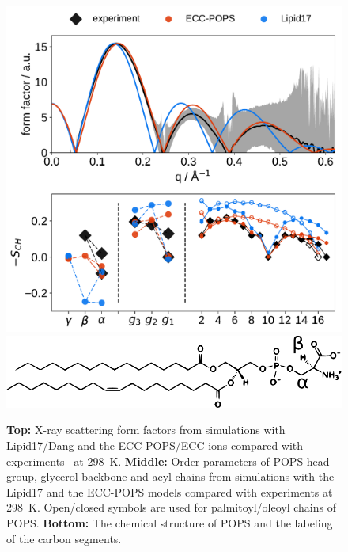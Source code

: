\documentclass[journal=jpcbfk,manuscript=article]{achemso}
\newlength{\figwidth}
\begin{document}
\begin{figure}[tb!] 
  \centering 
  \includegraphics[width=\figwidth]{../img/ecc_pops/Order-parameters_form-factors_exp-L17-ECC-lipids.pdf}
  \includegraphics[width=\figwidth]{../img/ecc_pops/pops_chemfig.pdf} 
\hfill
  \caption{\label{simVSexpNOions_POPS} 
    \textbf{Top:} X-ray scattering form factors from simulations with Lipid17/Dang \citep{lipid17-future, dang2006} and 
    the ECC-POPS/ECC-ions \cite{martinek17, Pluhackova2016} compared with experiments~\citep{kucerka14} at 298~K. 
    \textbf{Middle:} Order parameters of POPS head group, glycerol backbone and acyl chains  
    from simulations with the Lipid17 \citep{lipid17-future} and the ECC-POPS models 
    compared with experiments at 298~K. \citep{nmrlipids_proj4}
    Open/closed symbols are used for palmitoyl/oleoyl chains of POPS. 
    \textbf{Bottom:} The chemical structure of POPS and the labeling of the carbon segments. 
  }  
\end{figure} 
 
\end{document}
